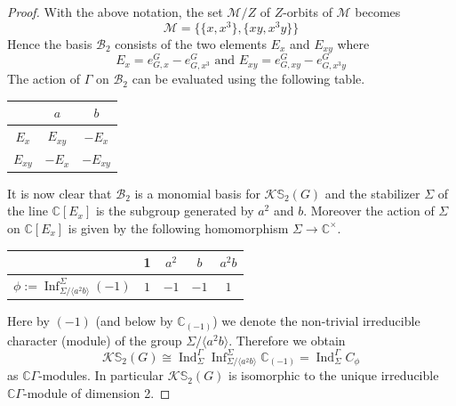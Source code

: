 \documentclass[12pt]{article}
\theoremstyle{plain}
\theoremstyle{definition}
\newcommand{\kerlint}{\mathbb S_2}
\newcommand{\ind}{\operatorname{Ind}}
\newcommand{\infl}{\operatorname{Inf}}
\begin{document}
\begin{proof}
With the above notation, the set $\mathcal M/Z$ of $Z$-orbits of $\mathcal{M}$ becomes
\[
\mathcal M = \big\{ \{x, x^3\}, \{xy, x^3y\}\big\}
\]
Hence the basis $\mathcal B_2$ consists of the two elements $E_x$ and $E_{xy}$ where 
\[
E_x = e_{G, x}^G - e_{G, x^3}^G \text{ and } E_{xy} = e_{G, xy}^G - e_{G, x^3y}^G
\]
The action of $\Gamma$ on $\mathcal{B}_2$ can be evaluated using the following table.
\begin{center}
    \begin{tabular}{c|cc}
         & $a$ & $b$  \\ \hline
         $E_x$ & $E_{xy}$ & $-E_{x}$  \\
         $E_{xy}$ & $-E_{x}$ & $-E_{xy}$  \\
           \end{tabular}
\end{center}
It is now clear that $\mathcal B_2$ is a monomial basis for $\mathcal{K}\kerlint(G)$ and the stabilizer $\Sigma$ of 
the line $\mathbb C[E_x]$ is the subgroup generated by $a^2$ and $b$. Moreover the action of $\Sigma$ on 
$\mathbb C[E_x]$ is given by the following homomorphism $\Sigma\to \mathbb C^\times$.
\begin{center}
    \begin{tabular}{c|cccc}
         & 1 & $a^2$ & $b$ & $a^2b$  \\ \midrule 
         $\phi:= \infl_{\Sigma/\langle a^2b\rangle}^\Sigma (-1)$ & $1$ & $-1$ & $-1$ & $1$  \\
           \end{tabular}
\end{center}
Here by $(-1)$ (and below by $\mathbb C_{(-1)}$) we denote the non-trivial irreducible character (module) of the group $\Sigma/\langle a^2b\rangle$. Therefore we obtain 
\[
\mathcal{K}\kerlint(G)\cong \ind_\Sigma^\Gamma \infl_{\Sigma/\langle a^2b\rangle}^\Sigma \mathbb C_{(-1)}= \ind_\Sigma^\Gamma C_\phi
\]
as $\mathbb C\Gamma$-modules. In particular $\mathcal{K}\kerlint(G)$ is isomorphic to the unique irreducible $\mathbb C\Gamma$-module of dimension 2.
\end{proof}
\end{document}
